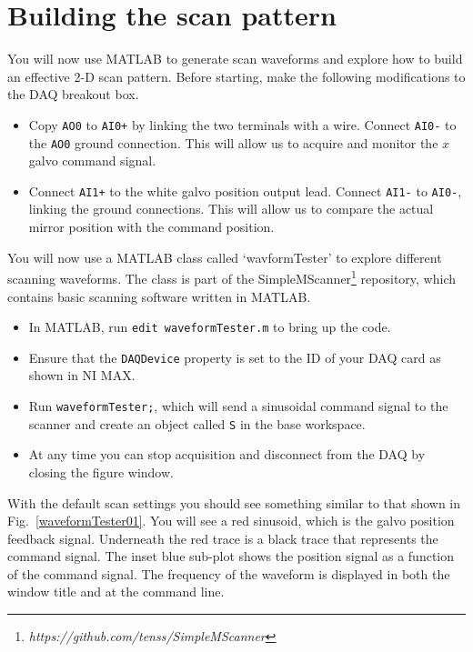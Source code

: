 \documentclass[a4paper]{report}
\begin{document}
\clearpage

\section{Building the scan pattern}

You will now use MATLAB to generate scan waveforms and explore how to build an effective 2-D scan pattern. 
Before starting, make the following modifications to the DAQ breakout box. 

\begin{itemize}
    \setlength\itemsep{0.15em}
    \item Copy \texttt{AO0} to \texttt{AI0+} by linking the two terminals with a wire. Connect \texttt{AI0-} to the \texttt{AO0} ground connection. This will allow us to acquire and monitor the $x$ galvo command signal.
    \item Connect \texttt{AI1+} to the white galvo position output lead.  Connect \texttt{AI1-} to \texttt{AI0-}, linking the ground connections. This will allow us to compare the actual mirror position with the command position.
\end{itemize}

\noindent
You will now use a MATLAB class called `wavformTester' to explore different scanning waveforms.
The class is part of the SimpleMScanner\footnote{\textit{https://github.com/tenss/SimpleMScanner}} repository, which contains basic scanning software written in MATLAB.


\begin{itemize}
\setlength\itemsep{0.15em}
\item In MATLAB, run \texttt{edit waveformTester.m} to bring up the code. 
\item Ensure that the \texttt{DAQDevice} property is set to the ID of your DAQ card as shown in NI MAX. 
\item Run \texttt{waveformTester;}, which will send a sinusoidal command signal to the scanner and create an object called \texttt{S} in the base workspace.
\item At any time you can stop acquisition and disconnect from the DAQ by closing the figure window.
\end{itemize}

\noindent
With the default scan settings you should see something similar to that shown in Fig.~\ref{waveformTester01}.
You will see a red sinusoid, which is the galvo position feedback signal. 
Underneath the red trace is a black trace that represents the command signal. 
The inset blue sub-plot shows the position signal as a function of the command signal. 
The frequency of the waveform is displayed in both the window title and at the command line. 
\end{document}

